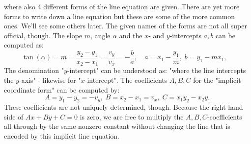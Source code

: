 where also 4 different forms of the line equation are given. There are yet more forms to write down a line equation but these are some of the more common ones. We'll see some others later. The given names of the forms are not all super official, though. The slope $m$, angle $\alpha$ and the $x$- and $y$-intercepts $a,b$ can be computed as: 
\begin{equation}
 \tan(\alpha) = m = \frac{y_2-y_1}{x_2-x_1} = \frac{v_y}{v_x} = -\frac{b}{a}, \quad
 a = x_1 - \frac{y_1}{m}, \; b = y_1 - m x_1, \quad
\end{equation}
The denomination "$y$-intercept" can be understood as: "where the line intercepts the $y$-axis" - likewise for "$x$-intercept". The coefficients $A,B,C$ for the "implicit coordinate form" can be computed by:
\begin{equation}
 A = y_1 - y_2 = -v_y, \; B = x_2 - x_1 = v_x, \; C = x_1 y_2 - x_2 y_1
\end{equation}
These coefficients are not uniquely determined, though. Because the right hand side of $Ax + By + C = 0$ is zero, we are free to multiply the $A,B,C$-coefficients all through by the same nonzero constant without changing the line that is encoded by this implicit line equation. 

